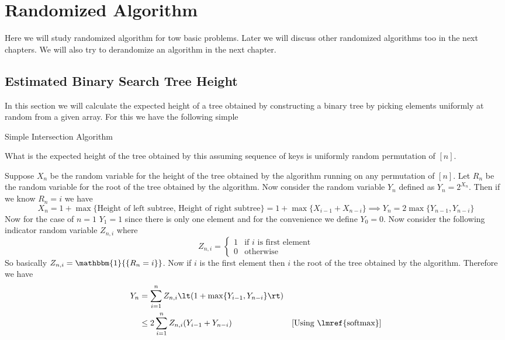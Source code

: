 \chapter{Randomized Algorithm}
Here we will study randomized algorithm for tow basic problems. Later we will discuss other randomized algorithms too in the next chapters. We will also try to derandomize an algorithm in the next chapter.
\section{Estimated Binary Search Tree Height}
In this section we will calculate the expected height of a tree obtained by constructing a binary tree by picking elements uniformly at random from a given array. For this we have the following simple 

\begin{algorithm}
\DontPrintSemicolon{}
\caption{Simple Intersection Algorithm}
\end{algorithm}

\begin{question}{}{}
	What is the expected height of the tree obtained by this  assuming sequence of keys is uniformly random permutation of $[n]$.
\end{question}

Suppose $X_n$ be the random variable for the height of the tree obtained by the algorithm running on any permutation of $[n]$. Let $R_n$ be the random variable for the root of the tree obtained by the algorithm. Now consider the random variable $Y_n$ defined as $Y_n=2^{X_n}$. Then if we know $R_n=i$ we have  $$X_n=1+\max\{\text{Height of left subtree, Height of right subtree}\}=1+\max\{X_{i-1}+X_{n-i}\}\implies Y_n=2\max\{Y_{n-1},Y_{n-i}\}$$Now for the case of $n=1$ $Y_1=1$  since there is only one element and for the convenience we define $Y_0=0$. Now consider the following indicator random variable $Z_{n,i}$ where $$Z_{n,i}=\begin{cases}
	1 & \text{if $i$ is first element}\\ 0 & \text{otherwise}
\end{cases}$$So basically $Z_{n,i}=\mathbbm{1}{\{R_n=i\}}$. Now if $i$ is the first element then $i$ the root of the tree obtained by the algorithm. Therefore we have \begin{align*}
Y_n &=\sum\limits_{i=1}^n Z_{n,i}\lt(1+\max\{Y_{i-1},Y_{n-i}\}\rt)\\
& \leq 2\sum\limits_{i=1}^nZ_{n,i}(Y_{i-1}+Y_{n-i}) & [\text{Using \lmref{softmax}}]
\end{align*}

